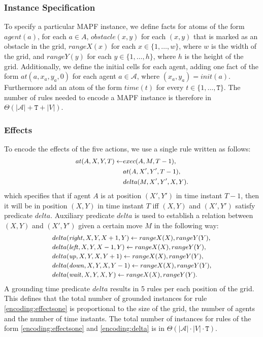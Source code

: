 \subsubsection{Instance Specification}
To specify a particular MAPF instance, we define facts for atoms of the form $agent(a)$, for each $a\in A$, $obstacle(x,y)$ for each $(x,y)$ that is marked as an obstacle in the grid, $rangeX(x)$ for each $x\in\{1,\ldots,w\}$, where $w$ is the width of the grid, and $rangeY(y)$ for each $y\in\{1,\ldots,h\}$, where $h$ is the height of the grid. Additionally, we define the initial cells for each agent, adding one fact of the form $at(a,x_a,y_a,0)$ for each agent $a\in \mathcal{A}$, where $(x_a,y_a)=init(a)$. Furthermore add an atom of the form $time(t)$ for every $t\in\{1,\dots,\mathtt{T}\}$. The number of rules needed to encode a MAPF instance is therefore in $\Theta(|\mathcal{A}| + \mathtt{T} + |V|)$.

\subsubsection{Effects}
To encode the effects of the five actions, we use a single rule written as follows:
\begin{equation}\small\label{encoding:effectsone}
\begin{split}
at(A,X,Y,T) \leftarrow &exec(A,M,T-1),\\&at(A,X',Y',T-1), \\&delta(M,X',Y',X,Y).
\end{split}
\end{equation}
which specifies that if agent $A$ is at position $(X',Y')$ in time instant $T-1$, then it will be in position $(X,Y)$ in time instant $T$ iff $(X,Y)$ and $(X',Y')$ satisfy predicate $delta$. Auxiliary predicate $delta$ is used to establish a relation between $(X,Y)$ and $(X',Y')$ given a certain move $M$ in the following way:
\begin{equation}\small\label{encoding:delta}
\begin{split}
&delta(\Right,X,Y,X+1,Y) \leftarrow rangeX(X), rangeY(Y),\\
&delta(\Left,X,Y,X-1,Y) \leftarrow rangeX(X), rangeY(Y),\\
&delta(\Up,X,Y,X,Y+1) \leftarrow rangeX(X), rangeY(Y),\\
&delta(\Down,X,Y,X,Y-1) \leftarrow rangeX(X), rangeY(Y),\\
&delta(\Wait,X,Y,X,Y) \leftarrow rangeX(X),rangeY(Y).
\end{split}
\end{equation}
A grounding time predicate $delta$ results in 5 rules per each position of the grid. This defines that the total number of grounded instances for rule \eqref{encoding:effectsone} is proportional to the size of the grid, the number of agents and the number of time instants. The total number of instances for rules of the form \eqref{encoding:effectsone} and \eqref{encoding:delta} is in $\Theta(|\mathcal{A}|\cdot |V| \cdot \mathtt{T})$.

